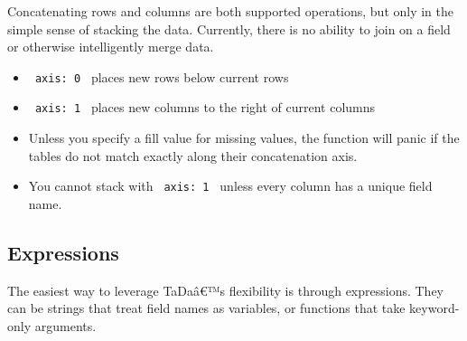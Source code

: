 Concatenating rows and columns are both supported operations, but only
in the simple sense of stacking the data. Currently, there is no ability
to join on a field or otherwise intelligently merge data.

\begin{itemize}
\item
  \texttt{\ axis:\ 0\ } places new rows below current rows
\item
  \texttt{\ axis:\ 1\ } places new columns to the right of current
  columns
\item
  Unless you specify a fill value for missing values, the function will
  panic if the tables do not match exactly along their concatenation
  axis.
\item
  You cannot stack with \texttt{\ axis:\ 1\ } unless every column has a
  unique field name.
\end{itemize}

\begin{Shaded}
\begin{Highlighting}[]

\NormalTok{  )}
\NormalTok{)}
\NormalTok{  )}
\NormalTok{)}

\end{Highlighting}
\end{Shaded}


\subsection{Expressions}\label{expressions}

The easiest way to leverage TaDaâ€™s flexibility is through expressions.
They can be strings that treat field names as variables, or functions
that take keyword-only arguments.

